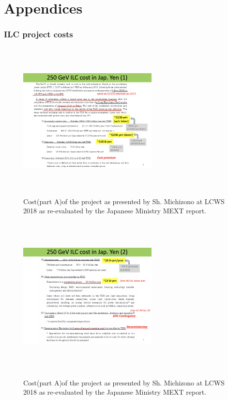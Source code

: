 \documentclass[%
 reprint,
 amsmath,amssymb,
 aps,
]{revtex4-1}
\begin{document}
%



\onecolumngrid
\newpage

\appendix
\part*{Appendices}

\section{\label{Appendix1}ILC project costs} 

\begin{figure}[h]
 \begin{center}
 \includegraphics[width=7cm, height=8cm]{figures/Cost1.png}
\caption{Cost(part A)of the project as presented by Sh. Michizono at LCWS 2018 as re-evaluated by the Japanese Ministry MEXT report. \label{Cost1}}
 \end{center}
 \end{figure}

\begin{figure}[h]
 \begin{center}
 \includegraphics[width=7cm, height=8cm]{figures/Cost2.png}
\caption{ \label{Cost2}}Cost(part A)of the project as presented by Sh. Michizono at LCWS 2018 as re-evaluated by the Japanese Ministry MEXT report.
 \end{center}
 \end{figure}
\end{document}
